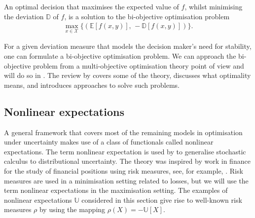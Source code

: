\documentclass[main.tex]{subfiles}
\begin{document}
\begin{problem}
  An optimal decision that maximises the expected value of $f$, whilst
  minimising the deviation $\mathbb{D}$ of $f$, is a solution to the
  bi-objective optimisation problem
  \begin{align}
    \max_{x\in\mathcal{X}}\{(\mathbb{E}[f(x,y)],\,-\mathbb{D}[f(x,y)])\}.
  \end{align}
\end{problem}
For a given deviation measure that models the decision maker's
need for stability, one can formulate a bi-objective optimisation
problem.
We can approach the bi-objective problem from a multi-objective
optimisation theory point of view and will do so in
.
The review by \citet{marler2004survey} covers some of the theory,
discusses what optimality means, and introduces approaches to solve
such problems.


\subsection{Nonlinear expectations}\label{sec:nonlinear_expectations}
A general framework that covers most of the remaining models
in optimisation under uncertainty makes use of a class of functionals
called nonlinear expectations. The term nonlinear expectation is used
by \citet{peng2010nonlinear} to generalise stochastic calculus to
distributional uncertainty.
The theory was inspired by work in finance for the study of financial
positions using
risk measures, see,
for example, \citet[Ch.~4]{follmer2004stochastic}.
Risk measures are used in a minimisation setting related to losses,
but we will use the term nonlinear expectations in the maximisation
setting. The examples of nonlinear expectations $\mathbb{U}$ considered
in this section give rise to well-known risk measures $\rho$ by using the mapping
$\rho(X) = -\mathbb{U}[X]$.
\end{document}
